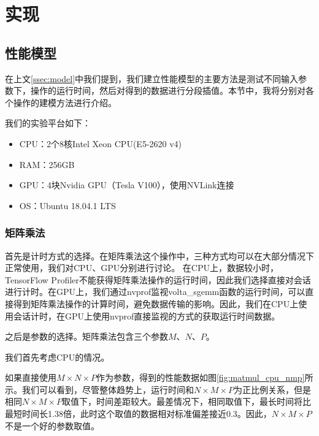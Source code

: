 \chapter{实现}
\label{cha:impl}

\section{性能模型}
\label{sec:impl_model}
    在上文\ref{ssec:model}中我们提到，我们建立性能模型的主要方法是测试不同输入参数下，操作的运行时间，然后对得到的数据进行分段插值。本节中，我将分别对各个操作的建模方法进行介绍。
    
    我们的实验平台如下：
    
    \begin{itemize}
        \setlength{\itemindent}{1em}
        \item CPU：2个8核Intel Xeon CPU(E5-2620 v4)
        \item RAM：256GB
        \item GPU：4块Nvidia GPU（Tesla V100），使用NVLink连接
        \item OS：Ubuntu 18.04.1 LTS
    \end{itemize}

\subsection{矩阵乘法}
\label{ssec:impl_matmul}
    首先是计时方式的选择。在矩阵乘法这个操作中，三种方式均可以在大部分情况下正常使用，我们对CPU、GPU分别进行讨论。
    在CPU上，数据较小时，TensorFlow Profiler不能获得矩阵乘法操作的运行时间，因此我们选择直接对会话进行计时。在GPU上，我们通过nvprof监视volta\_sgemm函数的运行时间，可以直接得到矩阵乘法操作的计算时间，避免数据传输的影响。因此，我们在CPU上使用会话计时，在GPU上使用nvprof直接监视的方式的获取运行时间数据。

    之后是参数的选择。矩阵乘法包含三个参数$ M $、$ N $、$ P $。
    
    我们首先考虑CPU的情况。
    
    如果直接使用$ M \times N \times P $作为参数，得到的性能数据如图\ref{fig:matmul_cpu_nmp}所示。我们可以看到，尽管整体趋势上，运行时间和$ N \times M \times P $为正比例关系，但是相同$ N \times M \times P $取值下，时间差距较大。最差情况下，相同取值下，最长时间将比最短时间长1.38倍，此时这个取值的数据相对标准偏差接近0.3。因此，$ N \times M \times P $不是一个好的参数取值。
    
